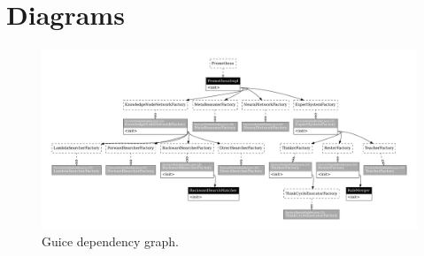 \documentclass[titlepage,11pt]{article}
\begin{document}
\clearpage
\onecolumn

{}


\appendix
\renewcommand\thefigure{\thesection.\arabic{figure}}
\setcounter{figure}{0}

\clearpage
	\section{Diagrams}
	\label{sec:diagrams}
	\begin{figure}[!htb]
		\includegraphics[width=\columnwidth]{figures/guice_graph.pdf}
		\caption{Guice dependency graph.}
		\label{fig:guice_graph}
	\end{figure}
\end{document}
